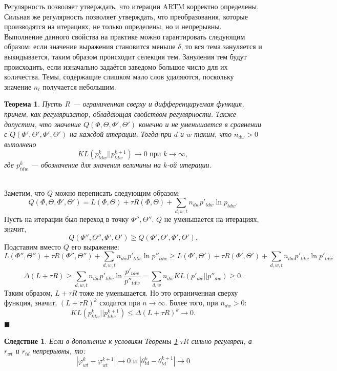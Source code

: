 \documentclass[12pt]{article}
\newtheorem{theorem}{Теорема}
\newtheorem{conseq}{Следствие}[theorem]
\newenvironment{Proof} 
	{\par\noindent{\bf Доказательство.}} 
	{\hfill$\blacksquare$}
\renewcommand{\leq}{\leqslant}
\renewcommand{\geq}{\geqslant}
\renewcommand{\phi}{\varphi}
\begin{document}
 Регулярность позволяет утверждать, что итерации ARTM корректно определены. Сильная же регулярность позволяет утверждать, что преобразования, которые производятся на итерациях, не только определены, но и непрерывны. Выполнение данного свойства на практике  можно гарантировать следующим образом: если значение выражения становится меньше $\delta$, то вся тема зануляется  и выкидывается, таким образом происходит селекция тем. Зануления тем будут происходить, если  изначально задаётся заведомо большое число для их количества. Темы, содержащие слишком мало слов удаляются, поскольку значение $n_t$ получается небольшим.
	\begin{theorem} \label{theorem_neighbour_zero1} Пусть $R$ --- ограниченная сверху и дифференцируемая функция, причем, как регуляризатор, обладающая свойством регулярности. Также допустим,  что значение $Q(\Phi, \Theta, \Phi', \Theta')$ конечно и не уменьшается в сравнении с $Q(\Phi', \Theta', \Phi', \Theta')$ на каждой итерации. Тогда при $d$ и $w$ таким, что $n_{dw} > 0$ выполнено
\[
KL(p_{tdw}^{k}||p_{tdw}^{k + 1}) \to 0 \text{ при } k \to \infty,
\]
где $p_{tdw}^{k}$ --- обозначение для значения величины на $k$-ой итерации.
	\end{theorem}
	\begin{Proof}\ \\
Заметим, что $Q$ можно переписать следующим образом:
\[
Q(\Phi, \Theta, \Phi', \Theta') = L(\Phi, \Theta) + \tau R(\Phi, \Theta) + \sum\limits_{d, w, t} n_{dw} p'_{tdw} \ln{p_{tdw}}.
\]
Пусть на итерации был переход в точку $\Phi'', \Theta''$. $Q$ не уменьшается на итерациях, значит,
\[
	Q(\Phi'', \Theta'', \Phi', \Theta') \geq Q(\Phi', \Theta', \Phi', \Theta').
\]
Подставим вместо $Q$ его выражение:
\[
	L(\Phi'', \Theta'') + \tau R(\Phi'', \Theta'') + \sum\limits_{d, w, t} n_{dw} p'_{tdw} \ln{p''_{tdw}}  \geq L(\Phi', \Theta') + \tau R(\Phi', \Theta') + \sum\limits_{d, w, t} n_{dw} p'_{tdw} \ln{p'_{tdw}}
\]
\[
	\Delta(L + \tau R) \geq  \sum\limits_{d, w, t} n_{dw} p'_{tdw} \ln{\frac{p'_{tdw}}{p''_{tdw}}} = \sum\limits_{d, w} n_{dw} KL(p'_{dw} || p''_{dw}) \geq 0.
\]
Таким образом, $L + \tau R$  тоже не уменьшается. Но это ограниченная сверху функция, значит, $(L + \tau R)^{k}$ сходится при $n \to \infty$. Более того, при $n_{dw} > 0$:
\[
	KL(p_{tdw}^{k}||p_{tdw}^{k+1}) \leq \Delta (L + \tau R)^{k} \to 0.
\]
\end{Proof}\ \\
\begin{conseq}
Если в дополнение к условиям Теоремы \ref{theorem_neighbour_zero1} $\tau R$ сильно регулярен, а $r_{wt}$ и $r_{td}$ непрерывны, то:
\[
|\phi_{wt}^{k} - \phi_{wt}^{k+1}| \to 0 \text{ и } |\theta_{td}^{k} - \theta_{td}^{k+1}| \to 0
\]
\end{conseq}
\end{document}
